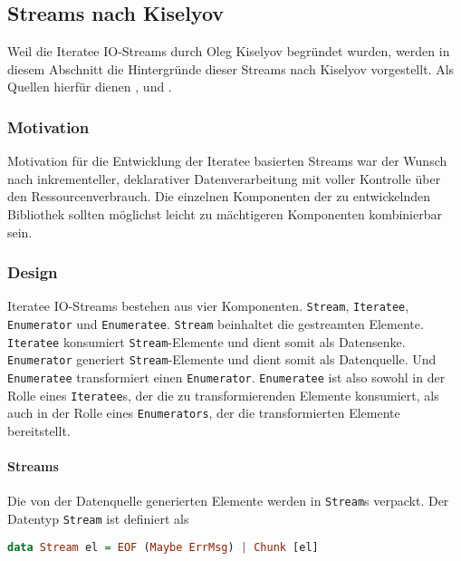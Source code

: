 \documentclass[draft=false
              ,paper=a4
              ,twoside=false
              ,fontsize=11pt
              ,headsepline
              ,BCOR10mm
              ,DIV11
              ]{scrbook}
\begin{document}
\subsection{Streams nach Kiselyov} %
\label{sub:streams_nach_kiselyov}

Weil die Iteratee IO-Streams durch Oleg Kiselyov begründet wurden, werden in diesem Abschnitt die Hintergründe dieser Streams nach Kiselyov vorgestellt.
Als Quellen hierfür dienen \citealt{kiselyov2012}, \citealt{iteratee_io} und \citealt{monad_reader}.


\subsubsection{Motivation} %
\label{ssub:motivation}

Motivation für die Entwicklung der Iteratee basierten Streams war der Wunsch nach inkrementeller, deklarativer Datenverarbeitung mit voller Kontrolle über den Ressourcenverbrauch.
Die einzelnen Komponenten der zu entwickelnden Bibliothek sollten möglichst leicht zu mächtigeren Komponenten kombinierbar sein.



\subsubsection{Design} %
\label{ssub:design}

Iteratee IO-Streams bestehen aus vier Komponenten.
\lstinline|Stream|, \lstinline|Iteratee|, \lstinline|Enumerator| und \lstinline|Enumeratee|.
\lstinline|Stream| beinhaltet die gestreamten Elemente.
\lstinline|Iteratee| konsumiert \lstinline|Stream|-Elemente und dient somit als Datensenke.
\lstinline|Enumerator| generiert \lstinline|Stream|-Elemente und dient somit als Datenquelle.
Und \lstinline|Enumeratee| transformiert einen \lstinline|Enumerator|.
\lstinline|Enumeratee| ist also sowohl in der Rolle eines \lstinline|Iteratee|s, der die zu transformierenden Elemente konsumiert, als auch in der Rolle eines \lstinline|Enumerators|, der die transformierten Elemente bereitstellt.


\paragraph{Streams} %
\label{par:streams}\mbox{} %

Die von der Datenquelle generierten Elemente werden in \lstinline|Stream|s verpackt.
Der Datentyp \lstinline|Stream| ist definiert als
\begin{lstlisting}[language=Haskell]
data Stream el = EOF (Maybe ErrMsg) | Chunk [el]
\end{lstlisting}
\end{document}
